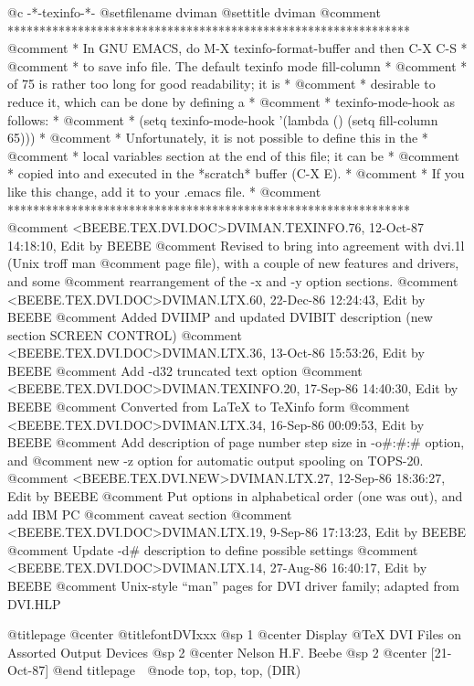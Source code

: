  @c -*-texinfo-*-
@setfilename dviman
@settitle dviman
@comment ***************************************************************
@comment * In GNU EMACS, do M-X texinfo-format-buffer and then C-X C-S *
@comment * to save info file.  The default texinfo mode fill-column    *
@comment * of 75 is rather too long for good readability; it is        *
@comment * desirable to reduce it, which can be done by defining a     *
@comment * texinfo-mode-hook as follows:                               *
@comment * (setq texinfo-mode-hook '(lambda () (setq fill-column 65))) *
@comment * Unfortunately, it is not possible to define this in the     *
@comment * local variables section at the end of this file; it can be  *
@comment * copied into and executed in the *scratch* buffer (C-X E).   *
@comment * If you like this change, add it to your .emacs file.        *
@comment ***************************************************************
@comment <BEEBE.TEX.DVI.DOC>DVIMAN.TEXINFO.76, 12-Oct-87 14:18:10, Edit by BEEBE
@comment Revised to bring into agreement with dvi.1l (Unix troff man
@comment page file), with a couple of new features and drivers, and some
@comment rearrangement of the -x and -y option sections.
@comment <BEEBE.TEX.DVI.DOC>DVIMAN.LTX.60, 22-Dec-86 12:24:43, Edit by BEEBE
@comment Added DVIIMP and updated DVIBIT description (new section SCREEN CONTROL)
@comment <BEEBE.TEX.DVI.DOC>DVIMAN.LTX.36, 13-Oct-86 15:53:26, Edit by BEEBE
@comment Add -d32 truncated text option
@comment <BEEBE.TEX.DVI.DOC>DVIMAN.TEXINFO.20, 17-Sep-86 14:40:30, Edit by BEEBE
@comment Converted from LaTeX to TeXinfo form
@comment <BEEBE.TEX.DVI.DOC>DVIMAN.LTX.34, 16-Sep-86 00:09:53, Edit by BEEBE
@comment Add description of page number step size in -o#:#:# option, and
@comment new -z option for automatic output spooling on TOPS-20.
@comment <BEEBE.TEX.DVI.NEW>DVIMAN.LTX.27, 12-Sep-86 18:36:27, Edit by BEEBE
@comment Put options in alphabetical order (one was out), and add IBM PC
@comment caveat section
@comment <BEEBE.TEX.DVI.DOC>DVIMAN.LTX.19,  9-Sep-86 17:13:23, Edit by BEEBE
@comment Update -d# description to define possible settings
@comment <BEEBE.TEX.DVI.DOC>DVIMAN.LTX.14, 27-Aug-86 16:40:17, Edit by BEEBE
@comment Unix-style ``man'' pages for DVI driver family; adapted from DVI.HLP

@titlepage
@center @titlefont{DVIxxx}
@sp 1
@center Display @TeX{} DVI Files on Assorted Output Devices
@sp 2
@center Nelson H.F. Beebe
@sp 2
@center [21-Oct-87]
@end titlepage

@node top, top, top, (DIR)

